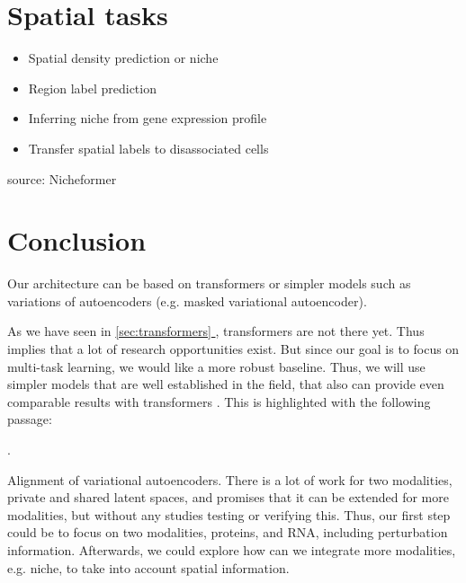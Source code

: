 \documentclass[12pt, a4paper]{article}
\newcommand*{\fullref}[1]{\hyperref[{#1}]{\ref*{#1} \nameref*{#1}}}
\begin{document}
\section{Spatial tasks}

\begin{itemize}
  \item Spatial density prediction or niche 
  \item Region label prediction 
  \item Inferring niche from gene expression profile
  \item Transfer spatial labels to disassociated cells
\end{itemize}
source: Nicheformer

\clearpage

\section{Conclusion}

Our architecture can be based on transformers or simpler models such as variations of autoencoders (e.g. masked variational autoencoder).

As we have seen in \fullref{sec:transformers}, transformers are not there yet. Thus implies that a lot of research opportunities exist. But since our goal is to focus on multi-task learning, we would like a more robust baseline. Thus, we will use simpler models that are well established in the field, that also can provide even comparable results with transformers \cite{szalataTransformersSinglecellOmics2024}. This is highlighted with the following passage:

 \cite{szalataTransformersSinglecellOmics2024}.

Alignment of variational autoencoders. There is a lot of work for two modalities, private and shared latent spaces, and promises that it can be extended for more modalities, but without any studies testing or verifying this. Thus, our first step could be to focus on two modalities, proteins, and RNA, including perturbation information. Afterwards, we could explore how can we integrate more modalities, e.g. niche, to take into account spatial information.
\end{document}
